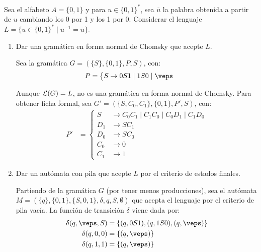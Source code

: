 \begin{ejercicio}\label{ej:1.5.10}
    Sea el alfabeto $A = \{0,1\}$ y para $u\in {\{0,1\}}^{\ast}$, sea $\overline{u}$ la palabra obtenida a partir de $u$ cambiando los 0 por 1 y los 1 por 0. Considerar el lenguaje $L = \{u\in {\{0,1\}}^{\ast} \mid u^{-1} = \overline{u}\}$.
    \begin{enumerate}
        \item Dar una gramática en forma normal de Chomsky que acepte $L$.
        
        Sea la gramática $G=(\{S\},\{0,1\},P,S)$, con:
        \begin{align*}
            P &= \left\{
                \begin{aligned}
                    S &\rightarrow 0S1\mid 1S0\mid \veps
                \end{aligned}
            \right.
        \end{align*}

        Aunque $\mathcal{L}(G)=L$, no es una gramática en forma normal de Chomsky. Para obtener ficha formal, sea $G'=(\{S,C_0,C_1\},\{0,1\},P',S)$, con:
        \begin{align*}
            P' &= \left\{
                \begin{aligned}
                    S &\rightarrow C_0C_1\mid C_1C_0\mid C_0D_1\mid C_1D_0\\
                    D_1 &\rightarrow SC_1\\
                    D_0 &\rightarrow SC_0\\
                    C_0 &\rightarrow 0 \\
                    C_1 &\rightarrow 1
                \end{aligned}
            \right.
        \end{align*}
        \item Dar un autómata con pila que acepte $L$ por el criterio de estados finales.
        
        Partiendo de la gramática $G$ (por tener menos producciones), sea el autómata $M = (\{q\},\{0,1\},\{S,0,1\},\delta,q,S,\emptyset)$ que acepta el lenguaje por el criterio de pila vacía. La función de transición $\delta$ viene dada por:
        \begin{align*}
            \delta(q,\veps, S) &= \{(q,0S1),(q,1S0),(q,\veps)\}\\
            \delta(q,0,0) &= \{(q,\veps)\}\\
            \delta(q,1,1) &= \{(q,\veps)\}
        \end{align*}


\end{enumerate}
\end{ejercicio}

